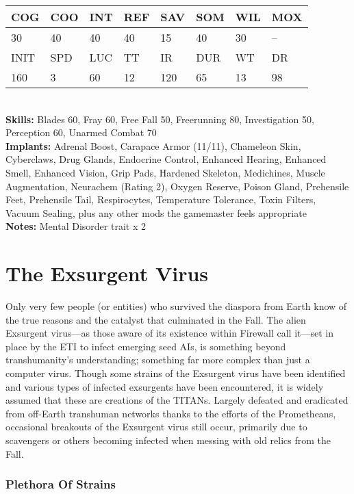 \begin{tabular}{|l|l|l|l|l|l|l|l|}
\hline
COG & COO & INT & REF & SAV & SOM & WIL & MOX \\
\hline
30 & 40 & 40 & 40 & 15 & 40 & 30 & -- \\
\hline
INIT & SPD & LUC & TT & IR & DUR & WT & DR \\
\hline
160 & 3 & 60 & 12 & 120 & 65 & 13 & 98 \\
\hline
\end{tabular}
\\
\textbf{Skills:} Blades 60, Fray 60, Free Fall 50, Freerunning 80, Investigation 50, Perception 60, Unarmed Combat 70 \\
\textbf{Implants:} Adrenal Boost, Carapace Armor (11/11), Chameleon Skin, Cyberclaws, Drug Glands, Endocrine Control, Enhanced Hearing, Enhanced Smell, Enhanced Vision, Grip Pads, Hardened Skeleton, Medichines, Muscle Augmentation, Neurachem (Rating 2), Oxygen Reserve, Poison Gland, Prehensile Feet, Prehensile Tail, Respirocytes, Temperature Tolerance, Toxin Filters, Vacuum Sealing, plus any other mods the gamemaster feels appropriate \\
\textbf{Notes:} Mental Disorder trait x 2

\section{The Exsurgent Virus }

Only very few people (or entities) who survived the 
diaspora from Earth know of the true reasons and 
the catalyst that culminated in the Fall. The alien Exsurgent
virus—as those aware of its existence within
Firewall call it—set in place by the ETI to infect 
emerging seed AIs, is something beyond transhumanity's
understanding; something far more complex
than just a computer virus. Though some strains of 
the Exsurgent virus have been identified and various 
types of infected exsurgents have been encountered, 
it is widely assumed that these are creations of the 
TITANs. Largely defeated and eradicated from off-Earth
transhuman networks thanks to the efforts of
the Prometheans, occasional breakouts of the Exsurgent
virus still occur, primarily due to scavengers or
others becoming infected when messing with old relics 
from the Fall.

\subsubsection{Plethora Of Strains }

